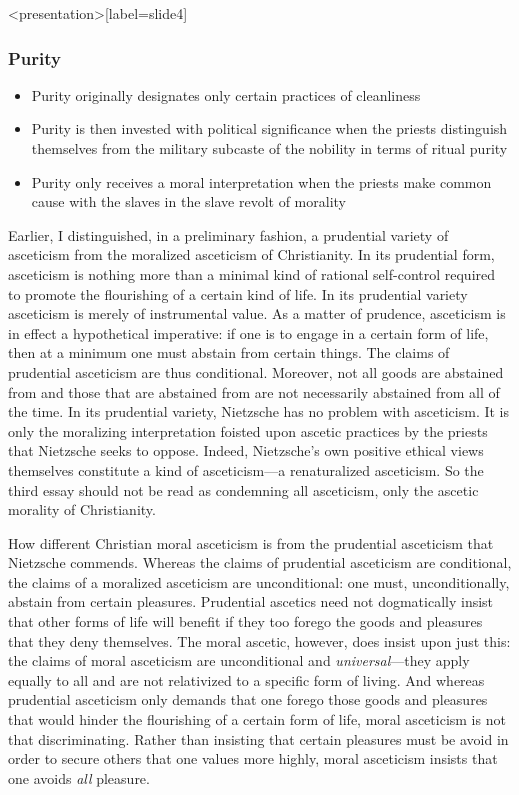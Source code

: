\begin{frame}<presentation>[label=slide4]
    \frametitle{Purity}
        \begin{itemize}
            \item Purity originally designates only certain practices of cleanliness
            \item Purity is then invested with political significance when the priests distinguish themselves from the military subcaste of the nobility in terms of ritual purity
            \item Purity only receives a moral interpretation when the priests make common cause with the slaves in the slave revolt of morality
        \end{itemize}
\end{frame}

Earlier, I distinguished, in a preliminary fashion, a prudential variety of asceticism from the moralized asceticism of Christianity. In its prudential form, asceticism is nothing more than a minimal kind of rational self-control required to promote the flourishing of a certain kind of life. In its prudential variety asceticism is merely of instrumental value. As a matter of prudence, asceticism is in effect a hypothetical imperative: if one is to engage in a certain form of life, then at a minimum one must abstain from certain things. The claims of prudential asceticism are thus conditional. Moreover, not all goods are abstained from and those that are abstained from are not necessarily abstained from all of the time. In its prudential variety, Nietzsche has no problem with asceticism. It is only the moralizing interpretation foisted upon ascetic practices by the priests that Nietzsche seeks to oppose. Indeed, Nietzsche's own positive ethical views themselves constitute a kind of asceticism---a renaturalized asceticism. So the third essay should not be read as condemning all asceticism, only the ascetic morality of Christianity.

How different Christian moral asceticism is from the prudential asceticism that Nietzsche commends. Whereas the claims of prudential asceticism are conditional, the claims of a moralized asceticism are unconditional: one must, unconditionally, abstain from certain pleasures. Prudential ascetics need not dogmatically insist that other forms of life will benefit if they too forego the goods and pleasures that they deny themselves. The moral ascetic, however, does insist upon just this: the claims of moral asceticism are unconditional and \emph{universal}---they apply equally to all and are not relativized to a specific form of living. And whereas prudential asceticism only demands that one forego those goods and pleasures that would hinder the flourishing of a certain form of life, moral asceticism is not that discriminating. Rather than insisting that certain pleasures must be avoid in order to secure others that one values more highly, moral asceticism insists that one avoids \emph{all} pleasure.

